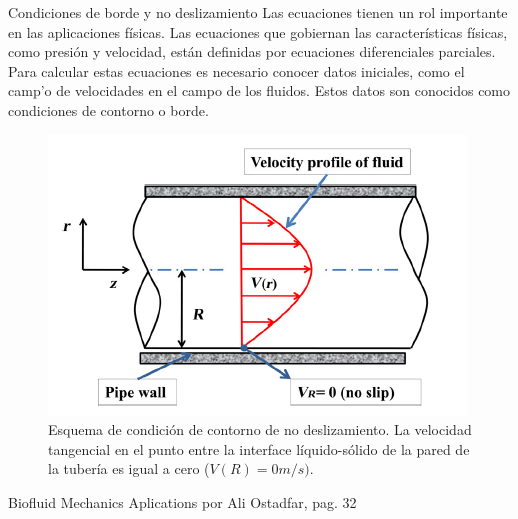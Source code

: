 \begin{frame}{Condiciones de borde y no deslizamiento}
\justifying
Las ecuaciones tienen un rol importante en las aplicaciones físicas. Las ecuaciones que gobiernan las características físicas, como presión y velocidad, están definidas por ecuaciones diferenciales parciales. Para calcular estas ecuaciones es necesario conocer datos iniciales, como el camp'o de velocidades en el campo de los fluidos. Estos datos son conocidos como condiciones de contorno o borde.
\begin{figure}[H]
\centering
\includegraphics[scale=0.4]{Section_Files/S2-imagenes-Manuel/13.png}
\caption{Esquema de condición de contorno de no deslizamiento. La velocidad tangencial en el punto entre la interface líquido-sólido de la pared de la tubería es igual a cero ($V(R)=0m/s)$.}
\end{figure}
{\tiny Biofluid Mechanics Aplications por Ali Ostadfar, pag. 32}
\end{frame}